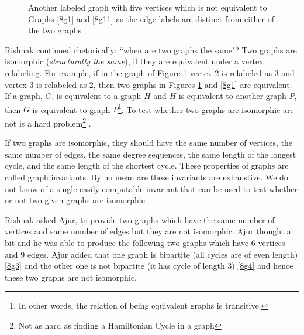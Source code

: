 \begin{figure}
\begin{center}
\caption{ Another labeled graph with five vertices which is not equivalent to Graphs \ref{8g1} and \ref{8g11} as the edge labels are distinct from either of the two graphs}\label{8g2}
\end{center}
\end{figure}

Rishnak continued rhetorically: ``when are two graphs the same"? Two graphs are isomorphic (\emph{structurally the same}), if they are equivalent under a vertex relabeling. For example, if in the graph of Figure \ref{8g2} vertex 2 is relabeled as 3 and vertex 3 is relabeled as 2, then two graphs in Figures \ref{8g2} and \ref{8g1} are equivalent. If a graph, $G$, is equivalent to a graph $H$ and $H$ is equivalent to another graph $P$, then $G$ is equivalent to graph $P$\footnote{In other words, the relation of being equivalent graphs is transitive.}. To test whether two graphs are isomorphic are not is a hard problem\footnote{Not as hard as finding a Hamiltonian Cycle in a graph} .

If two graphs are isomorphic, they should have the same number of vertices, the same number of edges, the same degree sequences, the same length of the longest cycle, and the same length of the shortest cycle.  These properties of graphs are called graph invariants. By no mean are these invariants are exhaustive. We do not know of a single easily computable invariant that can be used to test whether or not two given graphs are isomorphic. 

Rishnak asked Ajur, to provide two graphs which have the same number of vertices and same number of edges but they are not isomorphic. Ajur thought a bit and he was able to produce the following two graphs which have 6 vertices and 9 edges. Ajur added that one graph is bipartite (all cycles are of even length) \ref{8g3} and the other one is not bipartite (it has cycle of length 3) \ref{8g4} and hence these two graphs are not isomorphic.

